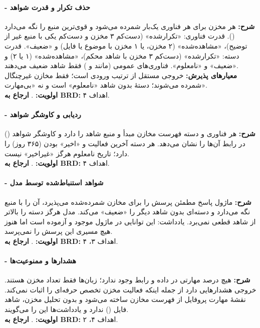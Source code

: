 \documentclass[12pt]{article}
\newcommand{\code}[1]{\lr{\texttt{#1}}}
\begin{document}
 \paragraph{ - حذف تکرار و قدرت شواهد}
\textbf{شرح:} هر مخزن برای هر فناوری یک‌بار شمرده می‌شود و قوی‌ترین منبع را نگه می‌دارد (). قدرت فناوری: «تکرارشده» (دست‌کم ۳ مخزن و دست‌کم یکی با منبع غیر از توضیح)، «مشاهده‌شده» (۲ مخزن، یا ۱ مخزن با موضوع یا فایل) و «ضعیف». قدرت دسته: «تکرارشده» (دست‌کم ۳ مخزن با شاهد محکم)، «مشاهده‌شده» (۱ یا ۲) و «ضعیف» و «نامعلوم». فناوری‌های عمومی (مانند  و ) فقط شاهد ضعیف می‌دهند.
\\
\textbf{معیارهای پذیرش:} خروجی مستقل از ترتیب ورودی است؛ فقط مخازن غیرچنگال شمرده می‌شوند؛ دستهٔ بدون شاهد «نامعلوم» است و نه «بی‌مهارت».
\\
\textbf{اولویت:} . \textbf{ارجاع به BRD:} اهداف ۴.
 \paragraph{ - ردیابی و کاوشگر شواهد}
\textbf{شرح:} هر فناوری و دسته فهرست مخازن مبدأ و منبع شاهد را دارد و کاوشگر شواهد () در رابط آن‌ها را نشان می‌دهد. هر دسته آخرین فعالیت و «اخیر» بودن (۳۶۵ روز) را دارد؛ تاریخ نامعلوم هرگز «غیراخیر» نیست.
\\
\textbf{اولویت:} . \textbf{ارجاع به BRD:} اهداف ۴.
 \paragraph{ - شواهد استنباط‌شده توسط مدل}
\textbf{شرح:} ماژول پاسخ مطمئن پرسش \code{skill\_category} را برای مخازن شمرده‌شده می‌پذیرد، آن را با منبع  نگه می‌دارد و دسته‌ای بدون شاهد دیگر را «ضعیف» می‌کند. مدل هرگز دسته را بالاتر از شاهد قطعی نمی‌برد. یادداشت: این توانایی در ماژول موجود و آزموده است اما هنوز هیچ مسیری این پرسش را نمی‌پرسد.
\\
\textbf{اولویت:} . \textbf{ارجاع به BRD:} اهداف ۳، ۴.
 \paragraph{ - هشدارها و ممنوعیت‌ها}
\textbf{شرح:} هیچ درصد مهارتی در داده و رابط وجود ندارد؛ زبان‌ها فقط تعداد مخزن هستند. خروجی هشدارهایی دارد از جمله اینکه فعالیت مخزن تخصص حرفه‌ای را اثبات نمی‌کند. نقشهٔ مهارت پروفایل از فهرست مخازن ساخته می‌شود و بدون تحلیل مخزن، شاهد فایل () ندارد و یادداشت‌ها این را می‌گویند.
\\
\textbf{اولویت:} . \textbf{ارجاع به BRD:} اهداف ۴، ۲.
\end{document}
